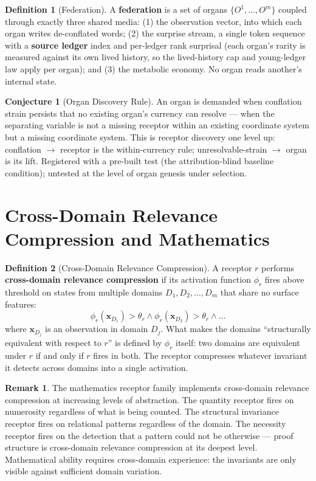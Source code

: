 \documentclass[12pt]{article}
\theoremstyle{definition}
\newtheorem{definition}{Definition}
\newtheorem{remark}{Remark}
\newtheorem{conjecture}{Conjecture}
\begin{document}
\begin{definition}[Federation]
A \textbf{federation} is a set of organs $\{O^1, \ldots, O^m\}$ coupled through exactly
three shared media: (1) the observation vector, into which each organ writes de-conflated
words; (2) the surprise stream, a single token sequence with a
\textbf{source ledger} index and per-ledger rank surprisal (each organ's rarity is
measured against its own lived history, so the lived-history cap and young-ledger law
apply per organ); and (3) the metabolic economy. No organ reads another's internal state.
\end{definition}

\begin{conjecture}[Organ Discovery Rule]
An organ is demanded when conflation strain persists that no existing organ's currency
can resolve --- when the separating variable is not a missing receptor within an existing
coordinate system but a missing coordinate system. This is receptor discovery one level
up: conflation $\to$ receptor is the within-currency rule; unresolvable-strain $\to$
organ is its lift. Registered with a pre-built test (the attribution-blind baseline
condition); untested at the level of organ genesis under selection.
\end{conjecture}

\section{Cross-Domain Relevance Compression and Mathematics}

\begin{definition}[Cross-Domain Relevance Compression]
A receptor $r$ performs \textbf{cross-domain relevance compression} if its activation
function $\phi_r$ fires above threshold on states from multiple domains
$D_1, D_2, \ldots, D_m$ that share no surface features:
\[
\phi_r(\mathbf{x}_{D_1}) > \theta_r \wedge \phi_r(\mathbf{x}_{D_2}) > \theta_r \wedge \ldots
\]
where $\mathbf{x}_{D_j}$ is an observation in domain $D_j$. What makes the domains
``structurally equivalent with respect to $r$'' is defined by $\phi_r$ itself: two
domains are equivalent under $r$ if and only if $r$ fires in both. The receptor
compresses whatever invariant it detects across domains into a single activation.
\end{definition}

\begin{remark}
The mathematics receptor family implements cross-domain relevance compression at
increasing levels of abstraction. The quantity receptor fires on numerosity regardless
of what is being counted. The structural invariance receptor fires on relational patterns
regardless of the domain. The necessity receptor fires on the detection that a pattern
could not be otherwise --- proof structure is cross-domain relevance compression at its
deepest level. Mathematical ability requires cross-domain experience: the invariants
are only visible against sufficient domain variation.
\end{remark}
\end{document}
